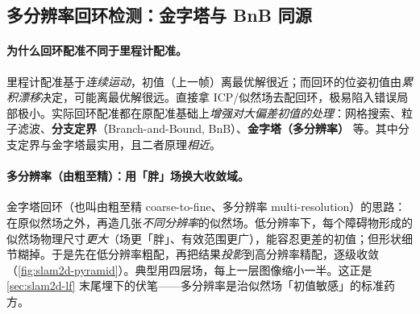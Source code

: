 \subsection{多分辨率回环检测：金字塔与 BnB 同源}
\label{sec:slam2d-mrlc}

\paragraph{为什么回环配准不同于里程计配准。}
里程计配准基于\emph{连续运动}，初值（上一帧）离最优解很近；而回环的位姿初值由\emph{累积漂移}决定，可能离最优解很远。直接拿 ICP/似然场去配回环，极易陷入错误局部极小。实际回环配准都在原配准基础上\emph{增强对大偏差初值的处理}：网格搜索、粒子滤波、\textbf{分支定界}（Branch-and-Bound, BnB）、\textbf{金字塔（多分辨率）} 等。其中分支定界与金字塔最实用，且二者原理\emph{相近}。

\paragraph{多分辨率（由粗至精）：用「胖」场换大收敛域。}
金字塔回环（也叫由粗至精 coarse-to-fine、多分辨率 multi-resolution）的思路：在原似然场之外，再造几张\emph{不同分辨率}的似然场。低分辨率下，每个障碍物形成的似然场物理尺寸\emph{更大}（场更「胖」、有效范围更广），能容忍更差的初值；但形状细节糊掉。于是先在低分辨率粗配，再把结果\emph{投影}到高分辨率精配，逐级收敛（\cref{fig:slam2d-pyramid}）。典型用四层场，每上一层图像缩小一半。这正是 \cref{sec:slam2d-lf} 末尾埋下的伏笔——多分辨率是治似然场「初值敏感」的标准药方。

